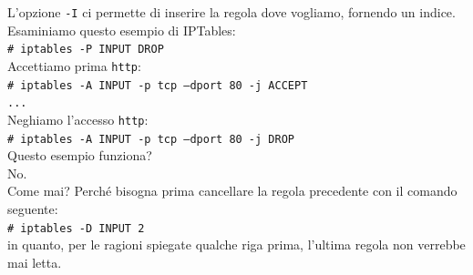 \documentclass[a4paper]{report}
\newcommand\tab[1][1cm]{\hspace*{#1}}
\begin{document}
L'opzione \texttt{-I} ci permette di inserire la regola dove vogliamo, fornendo un indice.\\
Esaminiamo questo esempio di IPTables:\\
\tab\texttt{\# iptables -P INPUT DROP}\\
Accettiamo prima \texttt{http}:\\
\tab\texttt{\# iptables -A INPUT -p tcp --dport 80 -j ACCEPT}\\
\tab\texttt{...}\\
Neghiamo l'accesso \texttt{http}:\\
\tab\texttt{\# iptables -A INPUT -p tcp --dport 80 -j DROP}\\
Questo esempio funziona?\\
No.\\
Come mai? Perché bisogna prima cancellare la regola precedente con il comando seguente:\\
\tab\texttt{\# iptables -D INPUT 2}\\
in quanto, per le ragioni spiegate qualche riga prima, l'ultima regola non verrebbe mai letta.\\
\end{document}
